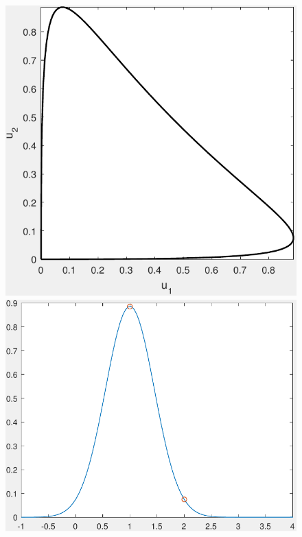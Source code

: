 \begin{figure}[ht]
\begin{minipage}[b]{0.32\linewidth}
			\end{minipage}
			\begin{minipage}[b]{0.32\linewidth}
				\includegraphics[width=\textwidth]{GammaTrace03}
			\end{minipage}
			\begin{minipage}[b]{0.32\linewidth}
				\includegraphics[width=\textwidth]{GammaTraceDensity01}

\end{minipage}
\end{figure}
